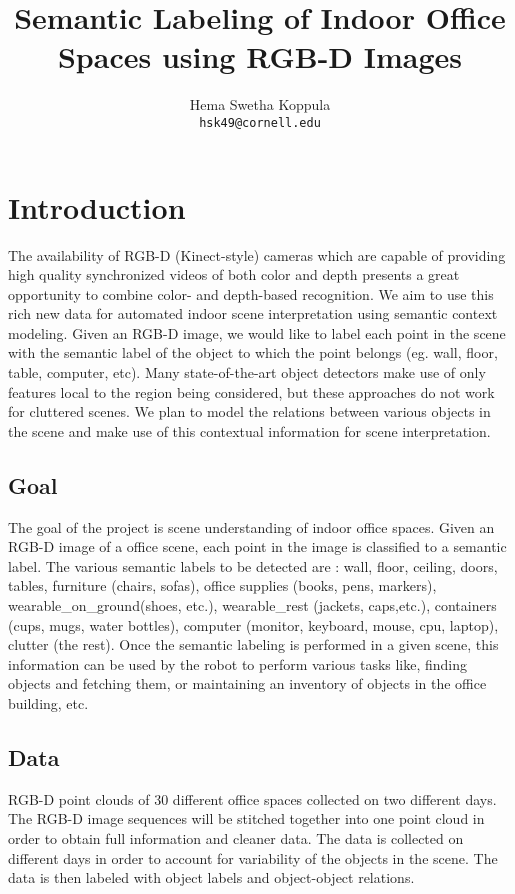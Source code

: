 \documentclass[11pt]{article} %
\title{Semantic Labeling of Indoor Office Spaces using RGB-D Images}
\author{
Hema Swetha Koppula \\
 \texttt{hsk49@cornell.edu}
}
\begin{document}
\maketitle

%

\section{Introduction}


  
  The availability of  RGB-D (Kinect-style) cameras \cite{kinect} which are capable of providing high quality synchronized 
  videos of both color and depth presents a great opportunity to combine color- and depth-based recognition. We aim 
  to use this rich new data for automated indoor scene interpretation using semantic context modeling. Given an RGB-D 
  image, we would like to label each point in the scene with the semantic label of the object to which the point belongs
  (eg. wall, floor, table, computer, etc). Many state-of-the-art object detectors make use of only features local to the region being 
  considered, but these approaches do not work for cluttered scenes. We plan to model the relations between various objects 
  in the scene and make use of this contextual information for scene interpretation. 

   \subsection{Goal}
     The goal of the project is scene understanding of indoor office spaces. Given an RGB-D image of a office scene, each point in the 
     image is classified to a semantic label. The various semantic labels to be detected are : wall, floor, ceiling, doors, tables, furniture 
     (chairs, sofas), office supplies (books, pens, markers), wearable\_on\_ground(shoes, etc.), wearable\_rest (jackets, caps,etc.), 
     containers (cups, mugs, water bottles), computer (monitor, keyboard, mouse, cpu, laptop), clutter (the rest). Once the semantic labeling 
     is performed in a given scene, this information can be used by the robot to perform various tasks like, finding objects and fetching them, 
     or maintaining an inventory of objects in the office building, etc.

   \subsection{Data}
     RGB-D point clouds of 30 different office spaces collected on two different days. The RGB-D image sequences will be stitched together
     into one point cloud in order to obtain full information and cleaner data. The data is collected on different days in order to account for 
     variability of the objects in the scene. The data is then labeled with object labels and object-object relations.
     
\end{document}
